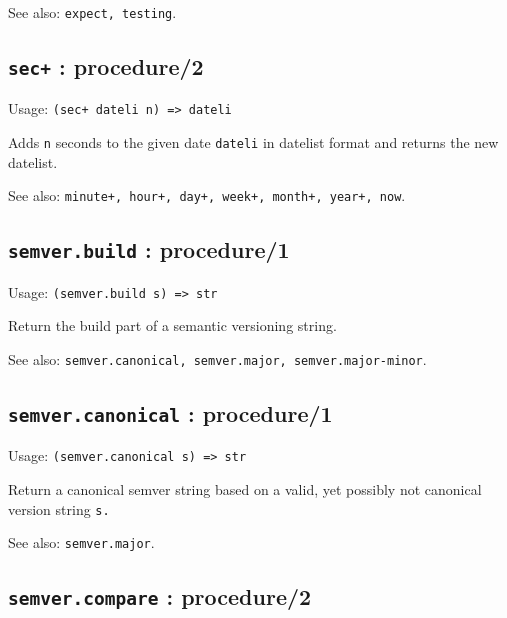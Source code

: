 \documentclass[
]{article}
\newcommand{\passthrough}[1]{#1}
\begin{document}
See also: \passthrough{\lstinline!expect, testing!}.

\hypertarget{sec-procedure2-1}{%
\subsection{\texorpdfstring{\texttt{sec+} :
procedure/2}{sec+ : procedure/2}}\label{sec-procedure2-1}}

Usage: \passthrough{\lstinline!(sec+ dateli n) => dateli!}

Adds \passthrough{\lstinline!n!} seconds to the given date
\passthrough{\lstinline!dateli!} in datelist format and returns the new
datelist.

See also:
\passthrough{\lstinline!minute+, hour+, day+, week+, month+, year+, now!}.

\hypertarget{semver.build-procedure1-1}{%
\subsection{\texorpdfstring{\texttt{semver.build} :
procedure/1}{semver.build : procedure/1}}\label{semver.build-procedure1-1}}

Usage: \passthrough{\lstinline!(semver.build s) => str!}

Return the build part of a semantic versioning string.

See also:
\passthrough{\lstinline!semver.canonical, semver.major, semver.major-minor!}.

\hypertarget{semver.canonical-procedure1-1}{%
\subsection{\texorpdfstring{\texttt{semver.canonical} :
procedure/1}{semver.canonical : procedure/1}}\label{semver.canonical-procedure1-1}}

Usage: \passthrough{\lstinline!(semver.canonical s) => str!}

Return a canonical semver string based on a valid, yet possibly not
canonical version string \passthrough{\lstinline!s.!}

See also: \passthrough{\lstinline!semver.major!}.

\hypertarget{semver.compare-procedure2-1}{%
\subsection{\texorpdfstring{\texttt{semver.compare} :
procedure/2}{semver.compare : procedure/2}}\label{semver.compare-procedure2-1}}
\end{document}
